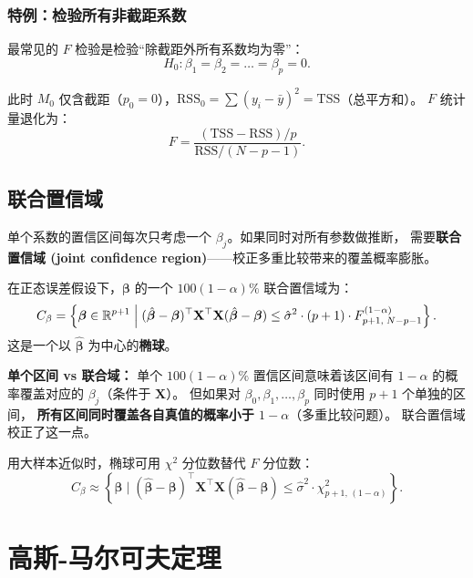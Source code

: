 \subsubsection{特例：检验所有非截距系数}

最常见的 $F$ 检验是检验``除截距外所有系数均为零''：
\[
    H_0: \beta_1 = \beta_2 = \dots = \beta_p = 0.
\]

此时 $M_0$ 仅含截距（$p_0 = 0$），$\mathrm{RSS}_0 = \sum (y_i - \bar{y})^2 = \mathrm{TSS}$（总平方和）。
$F$ 统计量退化为：
\begin{equation}\label{eq:F_overall}
    F = \frac{(\mathrm{TSS} - \mathrm{RSS}) / p}{\mathrm{RSS} / (N - p - 1)}.
\end{equation}

\subsection{联合置信域}

单个系数的置信区间每次只考虑一个 $\beta_j$。如果同时对所有参数做推断，
需要\textbf{联合置信域 (joint confidence region)}——校正多重比较带来的覆盖概率膨胀。

\begin{definition}
在正态误差假设下，$\bm{\beta}$ 的一个 $100(1-\alpha)\%$ 联合置信域为：
\begin{equation}\label{eq:joint_ci}
    C_\beta = \left\{
        \bm{\beta} \in \mathbb{R}^{p+1} \;\Big|\;
        (\hat{\bm{\beta}} - \bm{\beta})^\top \mathbf{X}^\top \mathbf{X}
        (\hat{\bm{\beta}} - \bm{\beta})
        \le \hat{\sigma}^2 \cdot (p+1) \cdot F_{p+1,\; N-p-1}^{(1-\alpha)}
    \right\}.
\end{equation}
这是一个以 $\hat{\bm{\beta}}$ 为中心的\textbf{椭球}。
\end{definition}

\textbf{单个区间 vs 联合域：}
单个 $100(1-\alpha)\%$ 置信区间意味着该区间有 $1-\alpha$ 的概率覆盖对应的 $\beta_j$（条件于 $\mathbf{X}$）。
但如果对 $\beta_0, \beta_1, \dots, \beta_p$ 同时使用 $p+1$ 个单独的区间，
\textbf{所有区间同时覆盖各自真值的概率小于 $1-\alpha$}（多重比较问题）。
联合置信域校正了这一点。

用大样本近似时，椭球可用 $\chi^2$ 分位数替代 $F$ 分位数：
\[
    C_\beta \approx \left\{
        \bm{\beta} \;\Big|\;
        (\hat{\bm{\beta}} - \bm{\beta})^\top \mathbf{X}^\top \mathbf{X}
        (\hat{\bm{\beta}} - \bm{\beta})
        \le \hat{\sigma}^2 \cdot \chi^2_{p+1,\,(1-\alpha)}
    \right\}.
\]

\section{高斯-马尔可夫定理}

